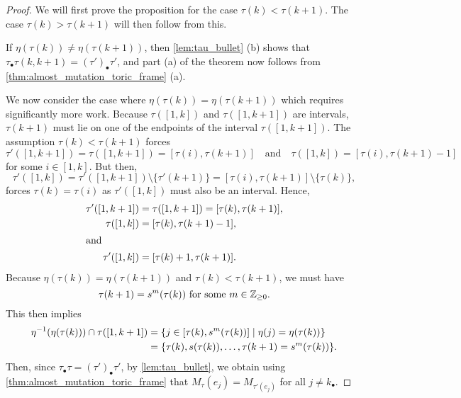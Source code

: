 \begin{proof}

	We will first prove the proposition for the case $\tau(k) < \tau(k+1)$. The case
	$\tau(k) > \tau(k+1)$ will then follow from this.

	If $\eta(\tau(k)) \neq \eta(\tau(k+1))$, then \cref{lem:tau_bullet} (b) shows that
	$\tau_\bullet \tau (k, k+1) = (\tau')_\bullet \tau'$, and part (a) of the theorem now
	follows from \cref{thm:almost_mutation_toric_frame} (a).

	We now consider the case where $\eta(\tau(k)) = \eta(\tau(k+1))$ which requires
	significantly more work. Because $\tau([1, k])$ and $\tau([1, k+1])$ are intervals,
	$\tau(k+1)$ must lie on one of the endpoints of the interval $\tau([1, k+1])$. The
	assumption $\tau(k) < \tau(k+1)$ forces
	\begin{equation*}
		\tau'([1, k+1]) = \tau([1, k+1]) = [\tau(i), \tau(k+1)] \quad \text{and}\quad \tau([1, k]) = [\tau(i), \tau(k+1) - 1]
	\end{equation*}
	for some $i\in [1, k]$. But then,
	\begin{equation*}
		\tau'([1, k]) = \tau'([1, k+1])\setminus\{\tau'(k+1)\} = [\tau(i), \tau(k+1)] \setminus \{\tau(k)\},
	\end{equation*}
	forces $\tau(k) = \tau(i)$ as $\tau'([1, k])$ must also be an interval. Hence,
	\begin{align*}
		\tau'([1, k+1]) & = \tau([1, k+1]) = [\tau(k), \tau(k+1)], \\
		\tau([1, k])    & = [\tau(k), \tau(k+1) - 1],              \\
		\shortintertext{and}
		\tau'([1, k])   & = [\tau(k) + 1, \tau(k+1)].
	\end{align*}
	Because $\eta(\tau(k)) = \eta(\tau(k+1))$ and $\tau(k) < \tau(k+1)$, we must have
	\begin{equation*}
		\tau(k+1) = s^m(\tau(k)) \text{ for some } m \in \mathbb{Z}_{\geq 0}.
	\end{equation*}
	This then implies
	\begin{equation}\label{eq:level_set_tau_k}
		\begin{aligned}
			\eta^{-1}(\eta(\tau(k))) \cap \tau([1, k+1])
			 & = \{j \in [\tau(k), s^m(\tau(k))] \mid \eta(j) = \eta(\tau(k))\} \\
			 & = \{\tau(k), s(\tau(k)), \dots, \tau(k+1) = s^m(\tau(k))\}.
		\end{aligned}
	\end{equation}
	Then, since $\tau_\bullet \tau = (\tau')_\bullet \tau'$, by \cref{lem:tau_bullet}, we
	obtain using \cref{thm:almost_mutation_toric_frame} that $M_\tau(e_j) = M_{\tau'(e_j)}$
	for all $j \neq k_\bullet$.


\end{proof}
